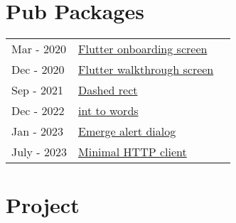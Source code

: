 \documentclass[]{deedy-resume-openfont}
\begin{document}
\begin{minipage}[t]{0.33\textwidth}



\section{Pub Packages \href{https://github.com/champ96k}{\faGithub} } 
\begin{tabular}{lll}
Mar - 2020	     & \href{https://pub.dev/packages/flutter_onboarding_screen}{Flutter onboarding screen}\\
Dec - 2020	         & \href{https://pub.dev/packages/flutter_walkthrough_screen} {Flutter walkthrough screen} \\
Sep - 2021	         & \href{https://pub.dev/packages/dashed_rect} {Dashed rect} \\
Dec - 2022	         & \href{https://pub.dev/packages/int_to_words} {int to words} \\
Jan - 2023	         & \href{https://pub.dev/packages/emerge_alert_dialog} {Emerge alert dialog} \\
July - 2023	         & \href{https://pub.dev/packages/minimal_http_client} { Minimal HTTP client} \\
\end{tabular}
\sectionsep


\section{Project} 


\end{minipage}
\end{document}
